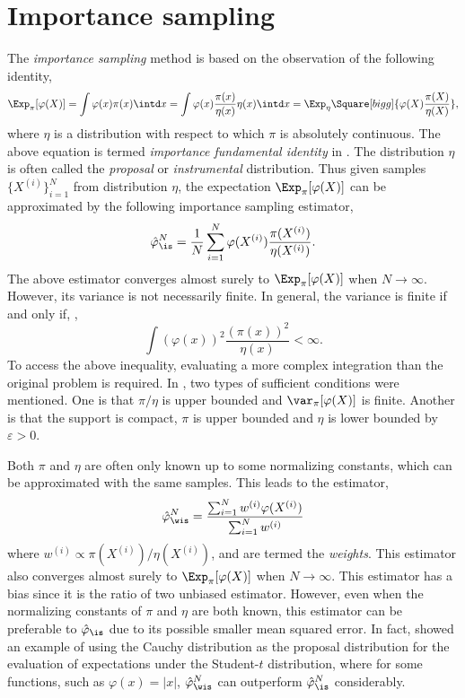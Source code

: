 \section{Importance sampling}
\label{sec:Importance sampling}

The \emph{importance sampling} method is based on the observation of the
following identity,
\begin{equation}
  \Exp_{\pi}[\varphi(X)]
  = \int\varphi(x)\pi(x)\intd x
  = \int\varphi(x)\frac{\pi(x)}{\eta(x)}\eta(x)\intd x
  = \Exp_{\eta}\Square[bigg]{\varphi(X)\frac{\pi(X)}{\eta(X)}},
  \label{eq:impotance fundamental}
\end{equation}
where $\eta$ is a distribution with respect to which $\pi$ is absolutely
continuous. The above equation is termed \emph{importance fundamental
  identity} in \cite{Robert:2004tn}. The distribution $\eta$ is often called
the \emph{proposal} or \emph{instrumental} distribution. Thus given \iid
samples $\{X^{(i)}\}_{i=1}^N$ from distribution $\eta$, the expectation
$\Exp_{\pi}[\varphi(X)]$ can be approximated by the following importance
sampling estimator,
\begin{equation}
  \hat\varphi_{\is}^N
  = \frac{1}{N}\sum_{i=1}^N\varphi(X^{(i)})\frac{\pi(X^{(i)})}{\eta(X^{(i)})}.
  \label{eq:is normalized}
\end{equation}
The above estimator converges almost surely to $\Exp_{\pi}[\varphi(X)]$ when
$N\to\infty$. However, its variance is not necessarily finite. In general, the
variance is finite if and only if, \cite[][sec.~3.3.2]{Robert:2004tn},
\begin{equation}
  \int(\varphi(x))^2\frac{(\pi(x))^2}{\eta(x)} < \infty.
\end{equation}
To access the above inequality, evaluating a more complex integration than the
original problem is required. In \cite{Geweke:1989tm}, two types of sufficient
conditions were mentioned. One is that $\pi/\eta$ is upper bounded and
$\var_{\pi}[\varphi(X)]$ is finite. Another is that the support is compact,
$\pi$ is upper bounded and $\eta$ is lower bounded by $\varepsilon > 0$.

Both $\pi$ and $\eta$ are often only known up to some normalizing constants,
which can be approximated with the same samples. This leads to the estimator,
\begin{equation}
  \hat\varphi_{\wis}^N
  = \frac{\sum_{i=1}^Nw^{(i)}\varphi(X^{(i)})}{\sum_{i=1}^Nw^{(i)}}
  \label{eq:is unnormalized}
\end{equation}
where $w^{(i)} \propto \pi(X^{(i)})/\eta(X^{(i)})$, and are termed the
\emph{weights}. This estimator also converges almost surely to
$\Exp_{\pi}[\varphi(X)]$ when $N\to\infty$. This estimator has a bias since it
is the ratio of two unbiased estimator. However, even when the normalizing
constants of $\pi$ and $\eta$ are both known, this estimator can be preferable
to $\hat\varphi_{\is}$ due to its possible smaller mean squared error. In
fact, \cite{Casella:1998tj} showed an example of using the Cauchy distribution
as the proposal distribution for the evaluation of expectations under the
Student-$t$ distribution, where for some functions, such as $\varphi(x) =
|x|$, $\hat\varphi_{\wis}^N$ can outperform $\hat\varphi_{\is}^N$
considerably.

